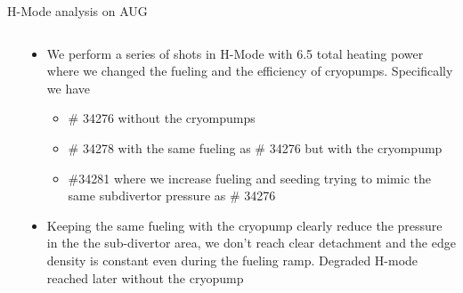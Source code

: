 \documentclass[10pt, compress]{beamer}
\newcommand\Fontvi{\fontsize{8}{7.2}\selectfont}
\begin{document}
\begin{frame}{H-Mode analysis on AUG}
    \Fontvi
  \vspace{-1cm}
  \begin{columns}
  \begin{column}{0.55\textwidth}
  \end{column}
  \begin{column}{0.45\textwidth}
    \begin{itemize}
    \item<1|only@1> We perform a series of shots in H-Mode with 6.5
      total heating power where we changed the fueling and the
      efficiency of cryopumps. Specifically we have
      \begin{itemize}
        \item<1|only@1>\textcolor{colorA}{\# 34276 without the
            cryompumps}
        \item<1|only@1> \textcolor{colorB}{\# 34278 with the same
            fueling as \# 34276 but with the cryompump}
        \item<1|only@1> \textcolor{colorC}{\#34281 where we increase
            fueling and seeding trying to mimic the same subdivertor
            pressure as \# 34276}
      \end{itemize}
    \item<1|only@1> Keeping the same fueling with the cryopump clearly
      reduce the pressure in the the sub-divertor area, we don't reach
      clear detachment and the edge density is constant even during
      the fueling ramp. Degraded H-mode reached later without the cryopump
      

\end{itemize}
\end{column}
\end{columns}
\end{frame}
\end{document}
